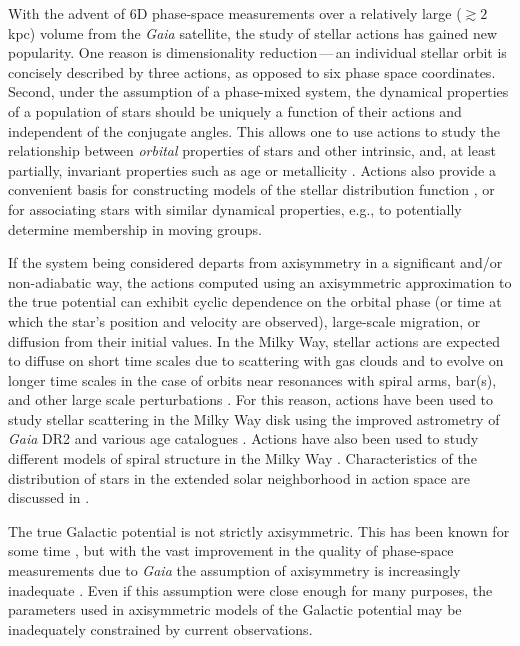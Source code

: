\documentclass[twocolumn]{aastex62}
\begin{document}
With the advent of 6D phase-space measurements over a relatively large
($\gtrsim 2$ kpc) volume from the \textit{Gaia} satellite, the study of
stellar actions has gained new popularity. One reason is dimensionality
reduction\,---\,an individual stellar orbit is concisely described by three
actions, as opposed to six phase space coordinates. Second, under the
assumption of a phase-mixed system, the dynamical properties of a population
of stars should be uniquely a function of their actions and independent of the
conjugate angles. This allows one to use actions to study the relationship
between \emph{orbital} properties of stars and other intrinsic, and, at least
partially, invariant properties such as age or metallicity
\citep{2018ApJ...867...31B, 2018arXiv180803278T, 2018MNRAS.481.4093S,
2019arXiv190304030G, 2019arXiv190309320D, 2019MNRAS.486.1167B}. Actions also
provide a convenient basis for constructing models of the stellar distribution
function \citep[e.g.,][]{1915MNRAS..76...70J, 1985ApJ...295..388V,
2017ApJ...839...61T}, or for associating stars with similar dynamical
properties, e.g., to potentially determine membership in moving groups.

If the system being considered departs from axisymmetry in a significant
and/or non-adiabatic way, the actions computed using an axisymmetric
approximation to the true potential can exhibit cyclic dependence on the
orbital phase (or time at which the star's position and velocity are
observed), large-scale migration, or diffusion from their initial values. In
the Milky Way, stellar actions are expected to diffuse on short time scales
due to scattering with gas clouds and to evolve on longer time scales in the
case of orbits near resonances with spiral arms, bar(s), and other large scale
perturbations \citep{2014RvMP...86....1S}. For this reason, actions have been
used to study stellar scattering in the Milky Way disk using the improved
astrometry of \textit{Gaia} DR2 and various age catalogues
\citep{2018ApJ...867...31B, 2018arXiv180803278T}. Actions have also been used
to study different models of spiral structure in the Milky Way
\citep{2019MNRAS.tmp..155S}. Characteristics of the distribution of stars in
the extended solar neighborhood in action space are discussed in
\citet{2019MNRAS.484.3291T}.

The true Galactic potential is not strictly axisymmetric. This has been known
for some time \citep[e.g.,][]{1957AJ.....62...93K,2009MNRAS.396L..56M,
2012ApJ...750L..41W}, but with the vast improvement in the quality of
phase-space measurements due to \textit{Gaia} the assumption of axisymmetry is
increasingly inadequate \citep[e.g.,][]{2018Natur.561..360A,
2019MNRAS.485.3134L}. Even if this assumption were close enough for many
purposes, the parameters used in axisymmetric models of the Galactic potential
may be inadequately constrained by current observations.
\end{document}
